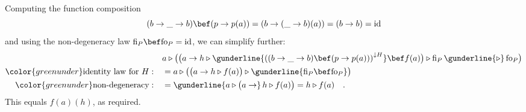 Computing the function composition
\[
(b\rightarrow\_\rightarrow b)\bef(p\rightarrow p(a))=(b\rightarrow(\_\rightarrow b)(a))=(b\rightarrow b)=\text{id}
\]
and using the non-degeneracy law $\text{fi}_{P}\bef\text{fo}_{P}=\text{id}$,
we can simplify further:
\begin{align*}
 & a\triangleright\big(\big(a\rightarrow h\triangleright\gunderline{\left((b\rightarrow\_\rightarrow b)\bef(p\rightarrow p(a))\right)^{\downarrow H}}\bef f(a)\big)\triangleright\text{fi}_{P}\,\gunderline{\triangleright}\,\text{fo}_{P}\big)\\
{\color{greenunder}\text{identity law for }H:}\quad & =a\triangleright\big(\big(a\rightarrow h\triangleright f(a)\big)\triangleright\gunderline{\text{fi}_{P}\bef\text{fo}_{P}}\big)\\
{\color{greenunder}\text{non-degeneracy}:}\quad & =\gunderline{a\triangleright\big(a\rightarrow}\,h\triangleright f(a)\big)=h\triangleright f(a)\quad.
\end{align*}
This equals $f(a)(h)$, as required.%
